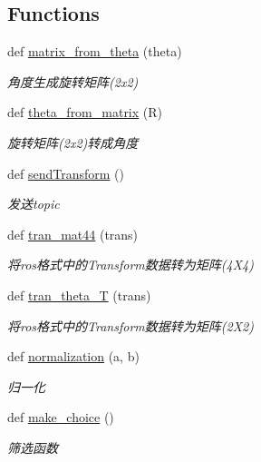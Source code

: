 \subsection*{Functions}
\begin{DoxyCompactItemize}
\item 
def \hyperlink{namespacefuse___g___a__dox_a74ca52501813c654c46db737d87fd009}{matrix\+\_\+from\+\_\+theta} (theta)
\begin{DoxyCompactList}\small\item\em 角度生成旋转矩阵(2x2) \end{DoxyCompactList}\item 
def \hyperlink{namespacefuse___g___a__dox_a3fb8553ee2aa4421c0b7e1931a0e06d3}{theta\+\_\+from\+\_\+matrix} (R)
\begin{DoxyCompactList}\small\item\em 旋转矩阵(2x2)转成角度 \end{DoxyCompactList}\item 
def \hyperlink{namespacefuse___g___a__dox_ad108902a215abb21ef4598a8465d1513}{send\+Transform} ()
\begin{DoxyCompactList}\small\item\em 发送topic \end{DoxyCompactList}\item 
def \hyperlink{namespacefuse___g___a__dox_afffb200826c683d789ba1613b24f12ff}{tran\+\_\+mat44} (trans)
\begin{DoxyCompactList}\small\item\em 将ros格式中的\+Transform数据转为矩阵(4\+X4) \end{DoxyCompactList}\item 
def \hyperlink{namespacefuse___g___a__dox_a223efed7f7635370a23a69ae03068b56}{tran\+\_\+theta\+\_\+T} (trans)
\begin{DoxyCompactList}\small\item\em 将ros格式中的\+Transform数据转为矩阵(2\+X2) \end{DoxyCompactList}\item 
def \hyperlink{namespacefuse___g___a__dox_ab338e80a4f259a8d14b03d63b4c19d3b}{normalization} (a, b)
\begin{DoxyCompactList}\small\item\em 归一化 \end{DoxyCompactList}\item 
def \hyperlink{namespacefuse___g___a__dox_ad6aad4771679d9483d428a51103c238b}{make\+\_\+choice} ()
\begin{DoxyCompactList}\small\item\em 筛选函数 \end{DoxyCompactList}\end{DoxyCompactItemize}
